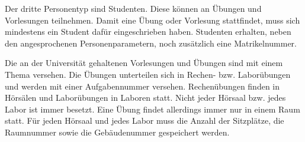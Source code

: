         Der dritte Personentyp sind Studenten. Diese können an Übungen und
        Vorlesungen teilnehmen. Damit eine Übung oder Vorlesung stattfindet,
        muss sich mindestens ein Student dafür eingeschrieben haben. Studenten
        erhalten, neben den angesprochenen Personenparametern, noch zusätzlich
        eine Matrikelnummer.

        Die an der Universität gehaltenen Vorlesungen und Übungen sind mit
        einem Thema versehen. Die Übungen unterteilen sich in Rechen- bzw.
        Laborübungen und werden mit einer Aufgabennummer versehen.
        Rechenübungen finden in Hörsälen und Laborübungen in Laboren
        statt. Nicht jeder Hörsaal bzw. jedes Labor ist immer besetzt. Eine
        Übung findet allerdings immer nur in einem Raum statt. Für jeden
        Hörsaal und jedes Labor muss die Anzahl der Sitzplätze, die
        Raumnummer sowie die Gebäudenummer gespeichert werden.
\clearpage